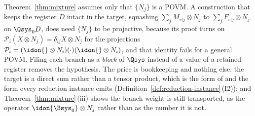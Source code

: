 
\begin{remark}
\label{rem:povmreg}
Theorem~\ref{thm:mixture} assumes only that $\{N_j\}$ is a POVM. A
construction that keeps the register $D$ intact in the target, squashing
$\sum_jM_{v|j}\otimes N_j$ to $\sum_jF_{v|j}\otimes N_j$ on $\Qsys_0D$, does
need $\{N_j\}$ to be projective, because its proof turns on
$\mathcal{P}_i(X\otimes N_j)=\delta_{ij}X\otimes N_j$ for the projections
$\mathcal{P}_i=(\idon{}\otimes N_i)(\cdot)(\idon{}\otimes N_i)$, and that
identity fails for a general POVM. Filing each branch as a \emph{block} of
$\Qsys$ instead of a value of a retained register removes the hypothesis. The
price is bookkeeping and nothing else: the target is a direct sum rather than
a tensor product, which is the  form of
 and the form every reduction instance emits
(Definition~\ref{def:reduction-instance}\,(I2)); and
Theorem~\ref{thm:mixture}\,(iii) shows the branch weight is still
transported, as the operator $\idon{\Bsys_0}\otimes N_j$ rather than as the
number it is not.
\end{remark}
